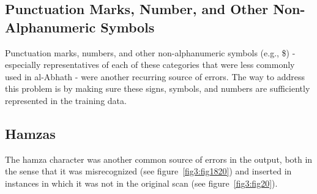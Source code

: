 \subsection{Punctuation Marks, Number, and Other Non-Alphanumeric Symbols}

Punctuation marks, numbers, and other non-alphanumeric symbols (e.g.,
\$) - especially representatives of each of these categories that were less
commonly used in al-Abhath - were another recurring source of errors. The way to
address this problem is by making sure these signs, symbols, and numbers are
sufficiently represented in the training data.

\subsection{Hamzas}

The hamza character was another common source of errors in the output, both in
the sense that it was misrecognized (see figure~\ref{fig3:fig1820}) and inserted
in instances in which it was not in the original scan (see
figure~\ref{fig3:fig20}). 

